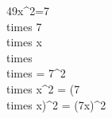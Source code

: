 \documentclass[preview]{standalone}
\begin{document}
\begin{center}
49x^2=7 \\times 7 \\times x \\times \\times = 7^2 \\times x^2 = (7 \\times x)^2 = (7x)^2
\end{center}
\end{document}
